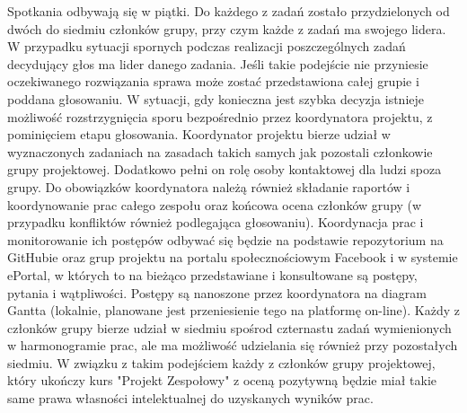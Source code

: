 Spotkania odbywają się w piątki. Do każdego z zadań zostało przydzielonych od dwóch do siedmiu członków grupy, przy czym każde z zadań ma swojego lidera. W przypadku sytuacji spornych podczas realizacji poszczególnych zadań decydujący głos ma lider danego zadania. Jeśli takie podejście nie przyniesie oczekiwanego rozwiązania sprawa może zostać przedstawiona całej grupie i poddana głosowaniu. W sytuacji, gdy konieczna jest szybka decyzja istnieje możliwość rozstrzygnięcia sporu bezpośrednio przez koordynatora projektu, z pominięciem etapu głosowania. Koordynator projektu bierze udział w wyznaczonych zadaniach na zasadach takich samych jak pozostali członkowie grupy projektowej. Dodatkowo pełni on rolę osoby kontaktowej dla ludzi spoza grupy. Do obowiązków koordynatora należą również składanie raportów i koordynowanie prac całego zespołu oraz końcowa ocena członków grupy (w przypadku konfliktów również podlegająca głosowaniu). Koordynacja prac i monitorowanie ich postępów odbywać się będzie na podstawie repozytorium na GitHubie oraz grup projektu na portalu społecznościowym Facebook i w systemie ePortal, w których to na bieżąco przedstawiane i konsultowane są postępy, pytania i wątpliwości. Postępy są nanoszone przez koordynatora na diagram Gantta (lokalnie, planowane jest przeniesienie tego na platformę on-line). Każdy z członków grupy bierze udział w siedmiu spośrod czternastu zadań wymienionych w harmonogramie prac, ale ma możliwość udzielania się również przy pozostałych siedmiu. W związku z takim podejściem każdy z członków grupy projektowej, który ukończy kurs "Projekt Zespołowy" z oceną pozytywną będzie miał takie same prawa własności intelektualnej do uzyskanych wyników prac.
